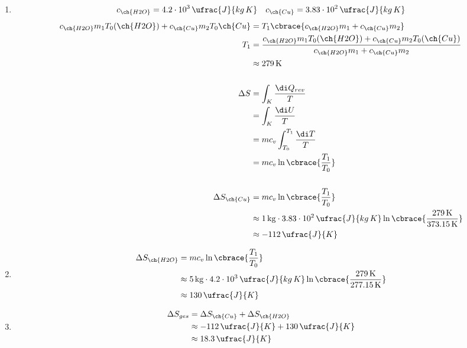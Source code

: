 \documentclass[11pt,letterpaper]{article}
\begin{document}
\begin{enumerate}
\begin{enumerate}
            \item
            \begin{align*}
                c_{\ch{H2O}} &= 4.2 \cdot 10^{3}\,\ufrac{J}{kg\,K} &
                c_{\ch{Cu}} &= 3.83\cdot 10^{2}\,\ufrac{J}{kg\,K}\\
            \end{align*}
            \begin{align*}
                c_{\ch{H2O}} m_1 T_0(\ch{H2O}) + c_{\ch{Cu}} m_2 T_0{\ch{Cu}} &= T_1 \cbrace{c_{\ch{H2O}} m_1  + c_{\ch{Cu}} m_2}  \\
                T_1 &= \frac{c_{\ch{H2O}} m_1 T_0(\ch{H2O}) + c_{\ch{Cu}} m_2 T_0(\ch{Cu})}{c_{\ch{H2O}} m_1  + c_{\ch{Cu}} m_2}\\
                &\approx 279\,\mathrm{K}\\
                \\
                \Delta S &= \int_{K} \frac{\di Q_{rev}}{T} \\
                &= \int_{K} \frac{\di U}{T}\\
                &= m c_{v}\int_{T_0}^{T_1} \frac{\di T}{T}\\
                &= m c_{v}\ln \cbrace{\frac{T_1}{T_0}} \\
                \\
                \Delta S_{\ch{Cu}} &= m c_{v}\ln \cbrace{\frac{T_1}{T_0}} \\
                &\approx 1\,\mathrm{kg} \cdot 3.83\cdot 10^{2}\,\ufrac{J}{kg\,K} \ln \cbrace{\frac{279\,\mathrm{K}}{373.15\, \mathrm{K}}}\\
                &\approx -112 \, \ufrac{J}{K} \\
            \end{align*}
            
            \item
            \begin{align*}
                \Delta S_{\ch{H2O}} &= m c_{v}\ln \cbrace{\frac{T_1}{T_0}} \\
                &\approx 5\,\mathrm{kg} \cdot 4.2\cdot 10^{3}\,\ufrac{J}{kg\,K} \ln \cbrace{\frac{279\,\mathrm{K}}{277.15\, \mathrm{K}}}\\
                &\approx 130 \, \ufrac{J}{K} \\
            \end{align*}

            \item
            \begin{align*}
                \Delta S_{ges} &= \Delta S_{\ch{Cu}} + \Delta S_{\ch{H2O}}\\
                &\approx -112 \, \ufrac{J}{K} + 130 \, \ufrac{J}{K}\\
                &\approx 18.3\, \ufrac{J}{K} 
            \end{align*}

        \end{enumerate}
    
\end{enumerate}


\end{document}
